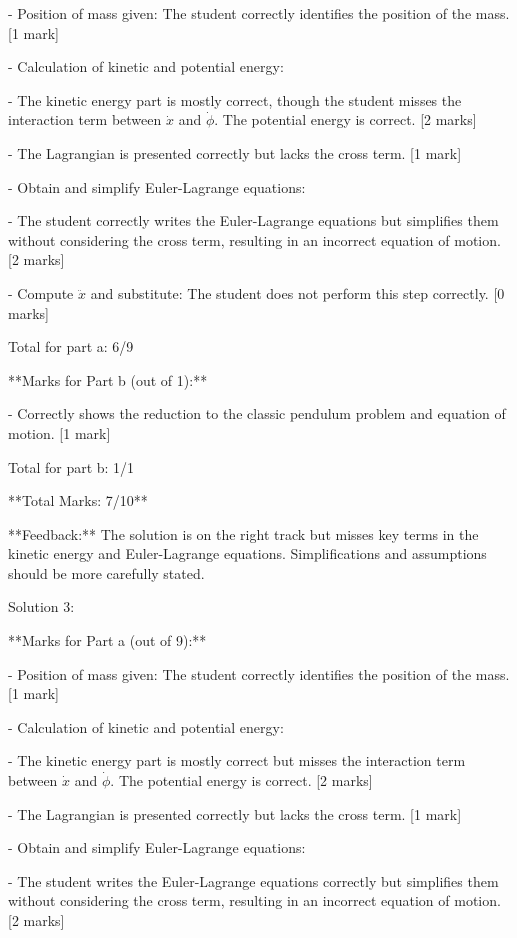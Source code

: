 \documentclass[a4paper,11pt]{article}
\begin{document}
- Position of mass given: The student correctly identifies the position of the mass. [1 mark]

- Calculation of kinetic and potential energy: 
  
  - The kinetic energy part is mostly correct, though the student misses the interaction term between \( \dot{x} \) and \( \dot{\phi} \). The potential energy is correct. [2 marks]
  
  - The Lagrangian is presented correctly but lacks the cross term. [1 mark]

- Obtain and simplify Euler-Lagrange equations:
 
  - The student correctly writes the Euler-Lagrange equations but simplifies them without considering the cross term, resulting in an incorrect equation of motion. [2 marks]

- Compute \( \ddot{x} \) and substitute: The student does not perform this step correctly. [0 marks]

Total for part a: 6/9

**Marks for Part b (out of 1):**

- Correctly shows the reduction to the classic pendulum problem and equation of motion. [1 mark]

Total for part b: 1/1

**Total Marks: 7/10**

**Feedback:** The solution is on the right track but misses key terms in the kinetic energy and Euler-Lagrange equations. Simplifications and assumptions should be more carefully stated.

Solution 3:

**Marks for Part a (out of 9):**

- Position of mass given: The student correctly identifies the position of the mass. [1 mark]

- Calculation of kinetic and potential energy: 
  
  - The kinetic energy part is mostly correct but misses the interaction term between \( \dot{x} \) and \( \dot{\phi} \). The potential energy is correct. [2 marks]
 
  - The Lagrangian is presented correctly but lacks the cross term. [1 mark]

- Obtain and simplify Euler-Lagrange equations:
  
  - The student writes the Euler-Lagrange equations correctly but simplifies them without considering the cross term, resulting in an incorrect equation of motion. [2 marks]
  
\end{document}
